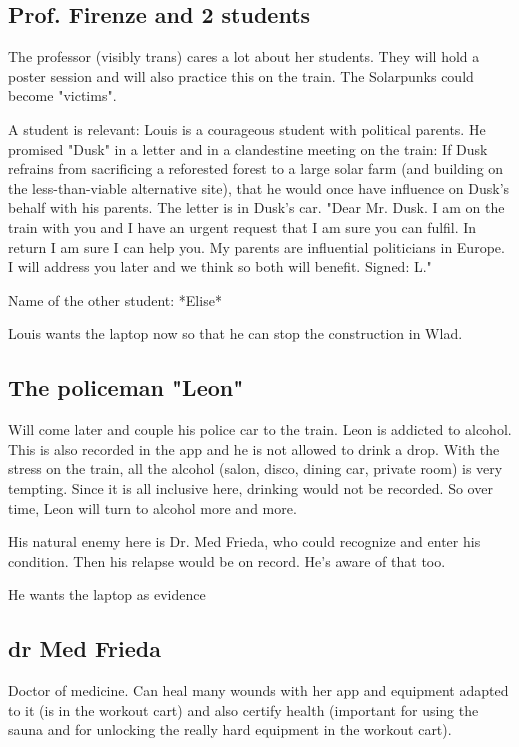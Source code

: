 \documentclass{book}
\begin{document}
\subsection{Prof. Firenze and 2 students}


The professor (visibly trans) cares a lot about her students. They will hold a poster session and will also practice this on the train. The Solarpunks could become "victims".

A student is relevant: Louis is a courageous student with political parents. He promised "Dusk" in a letter and in a clandestine meeting on the train: If Dusk refrains from sacrificing a reforested forest to a large solar farm (and building on the less-than-viable alternative site), that he would once have influence on Dusk's behalf with his parents. The letter is in Dusk's car.
"Dear Mr. Dusk. I am on the train with you and I have an urgent request that I am sure you can fulfil. In return I am sure I can help you. My parents are influential politicians in Europe. I will address you later and we think so both will benefit. Signed: L."

Name of the other student: *Elise*

Louis wants the laptop now so that he can stop the construction in Wlad.

\subsection{The policeman "Leon"}


Will come later and couple his police car to the train.
Leon is addicted to alcohol. This is also recorded in the app and he is not allowed to drink a drop. With the stress on the train, all the alcohol (salon, disco, dining car, private room) is very tempting. Since it is all inclusive here, drinking would not be recorded. So over time, Leon will turn to alcohol more and more.

His natural enemy here is Dr. Med Frieda, who could recognize and enter his condition. Then his relapse would be on record. He's aware of that too.

He wants the laptop as evidence

\subsection{dr Med Frieda}


Doctor of medicine. Can heal many wounds with her app and equipment adapted to it (is in the workout cart) and also certify health (important for using the sauna and for unlocking the really hard equipment in the workout cart).
\end{document}

